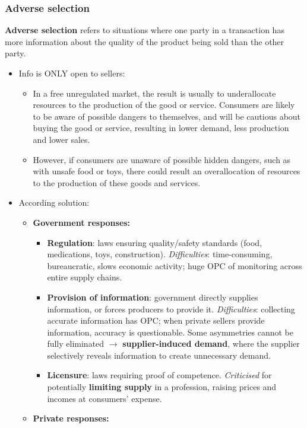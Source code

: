 \documentclass[a4paper,12pt]{article}
\newcommand{\needbold}[1]{\textcolor{red!70!black}{\textbf{#1}}}
\begin{document}
\subsubsection*{Adverse selection}
\needbold{Adverse selection} refers to situations where one party in a transaction has more information about the quality of the product being sold than the other party.
\begin{itemize}
  \item Info is ONLY open to sellers:
  \begin{itemize}
    \item In a free unregulated market, the result is usually to underallocate resources to the production of the good or service. Consumers are likely to be aware of possible dangers to themselves, and will be cautious about buying the good or service, resulting in lower demand, less production and lower sales.
    \item However, if consumers are unaware of possible hidden dangers, such as with unsafe food or toys, there could result an overallocation of resources to the production of these goods and services.
  \end{itemize}
  \item According solution:
  \begin{itemize}
      \item \textbf{Government responses:}
      \begin{itemize}
        \item \textbf{Regulation}: laws ensuring quality/safety standards (food, medications, toys, construction). \textit{Difficulties}: time-consuming, bureaucratic, slows economic activity; huge OPC of monitoring across entire supply chains.
        \item \textbf{Provision of information}: government directly supplies information, or forces producers to provide it. \textit{Difficulties}: collecting accurate information has OPC; when private sellers provide information, accuracy is questionable. Some asymmetries cannot be fully eliminated $\to$ \textbf{supplier-induced demand}, where the supplier selectively reveals information to create unnecessary demand.
        \item \textbf{Licensure}: laws requiring proof of competence. \textit{Criticised} for potentially \textbf{limiting supply} in a profession, raising prices and incomes at consumers' expense.
      \end{itemize}
      \item \textbf{Private responses:}

\end{itemize}
\end{itemize}
\end{document}
